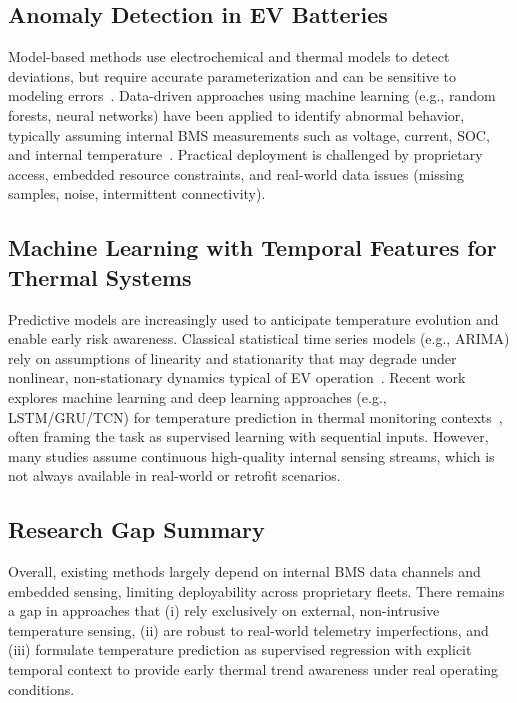 \documentclass[runningheads]{llncs}
\begin{document}
\subsection{Anomaly Detection in EV Batteries}
Model-based methods use electrochemical and thermal models to detect deviations, but require accurate parameterization and can be sensitive to modeling errors~\cite{togun2025comprehensive,yang20196077}. Data-driven approaches using machine learning (e.g., random forests, neural networks) have been applied to identify abnormal behavior, typically assuming internal BMS measurements such as voltage, current, SOC, and internal temperature~\cite{li2023thermal,li2021datadriven}. Practical deployment is challenged by proprietary access, embedded resource constraints, and real-world data issues (missing samples, noise, intermittent connectivity).

\subsection{Machine Learning with Temporal Features for Thermal Systems}
Predictive models are increasingly used to anticipate temperature evolution and enable early risk awareness. Classical statistical time series models (e.g., ARIMA) rely on assumptions of linearity and stationarity that may degrade under nonlinear, non-stationary dynamics typical of EV operation~\cite{box2015timeseries}. Recent work explores machine learning and deep learning approaches (e.g., LSTM/GRU/TCN) for temperature prediction in thermal monitoring contexts~\cite{li2023thermal,kirchgaessner2021motor}, often framing the task as supervised learning with sequential inputs. However, many studies assume continuous high-quality internal sensing streams, which is not always available in real-world or retrofit scenarios.

\subsection{Research Gap Summary}
Overall, existing methods largely depend on internal BMS data channels and embedded sensing, limiting deployability across proprietary fleets. There remains a gap in approaches that (i) rely exclusively on external, non-intrusive temperature sensing, (ii) are robust to real-world telemetry imperfections, and (iii) formulate temperature prediction as supervised regression with explicit temporal context to provide early thermal trend awareness under real operating conditions.
\end{document}
